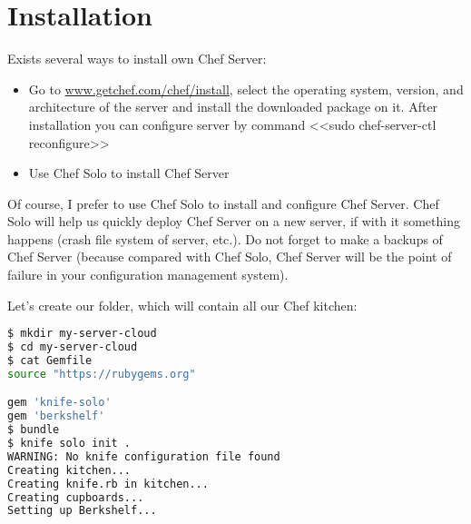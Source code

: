 \section{Installation}

Exists several ways to install own Chef Server:

\begin{itemize}
  \item Go to \href{http://www.getchef.com/chef/install/}{www.getchef.com/chef/install}, select the operating system, version, and architecture of the server and install the downloaded package on it. After installation you can configure server by command <<sudo chef-server-ctl reconfigure>>
  \item Use Chef Solo to install Chef Server
\end{itemize}

Of course, I prefer to use Chef Solo to install and configure Chef Server. Chef Solo will help us quickly deploy Chef Server on a new server, if with it something happens (crash file system of server, etc.). Do not forget to make a backups of Chef Server (because compared with Chef Solo, Chef Server will be the point of failure in your configuration management system).

Let's create our folder, which will contain all our Chef kitchen:

\begin{lstlisting}[language=Bash,label=lst:my-server-cloud-installation1]
$ mkdir my-server-cloud
$ cd my-server-cloud
$ cat Gemfile
source "https://rubygems.org"

gem 'knife-solo'
gem 'berkshelf'
$ bundle
$ knife solo init .
WARNING: No knife configuration file found
Creating kitchen...
Creating knife.rb in kitchen...
Creating cupboards...
Setting up Berkshelf...
\end{lstlisting}